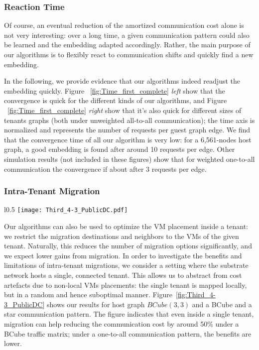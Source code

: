 \documentclass[conference]{IEEEtran}
\def\BC#1#2{BCube(#1,#2)}
\begin{document}
\subsubsection{Reaction Time}
Of course, an eventual reduction of the amortized communication cost alone is not very interesting: over a long time,
a given communication pattern could also be learned and the embedding adapted accordingly. Rather, the main purpose
of our algorithms is to flexibly react to communication shifts and quickly find a new embedding.

In the following, we provide evidence that our algorithms indeed readjust the embedding quickly. Figure ~\ref{fig:Time_first_complete} \emph{left} show that the convergence is quick for the different kinds of our algorithms, and Figure ~\ref{fig:Time_first_complete} \emph{right} show that it's also quick for different sizes of tenants graphs (both under unweighted all-to-all communication); the time axis is normalized and represents the number of requests per guest graph edge.
We find that the convergence time of all our algorithm is very low: for a 6,561-nodes host graph, a good embedding is found after around 10 requests per edge. Other simulation results (not included in these figures) show that for weighted one-to-all communication the convergence if about after 3 requests per edge.

\subsubsection{Intra-Tenant Migration}

\begin{wrapfigure}{l}{0.5\columnwidth}
				\centering
				\texttt{[image: Third\_4-3\_PublicDC.pdf]}
				\caption{Amortized communication cost on host graph \BC{3}{3}, and a BCube as well as a
star communication pattern (weighted).}
				\label{fig:Third_4-3_PublicDC}
\end{wrapfigure}
Our algorithms can also be used to optimize the VM placement inside a tenant: we restrict the migration destinations and neighbors
to the VMs of the given tenant. Naturally, this reduces the number of migration options significantly, and we expect lower gains from migration.
In order to investigate the benefits and limitations of intra-tenant migrations, we consider a setting where the substrate network
hosts a single, connected tenant. This allows us to abstract from cost artefacts due to non-local VMs placements: the single tenant
is mapped locally, but in a random and hence suboptimal manner.
Figure~\ref{fig:Third_4-3_PublicDC} shows our results for host graph $\BC{3}{3}$ and
a BCube and a star communication pattern. The figure indicates that
even inside a single tenant, migration can help reducing the communication
cost by around 50\% under a BCube traffic matrix; under a one-to-all
communication pattern, the benefits are lower.
\end{document}
